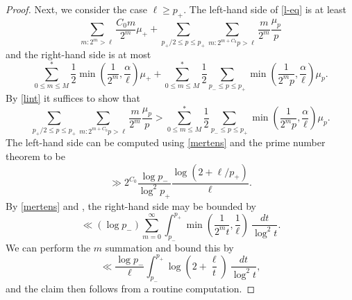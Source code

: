 \documentclass[12pt,a4paper,reqno]{amsart}
\numberwithin{equation}{section}
\theoremstyle{plain}
\theoremstyle{definition}
\begin{document}
\begin{proof}
Next, we consider the case $\ell \geq p_+$.  The left-hand side of \eqref{l-eq} is at least 
$$ \sum_{m: 2^m > \ell} \frac{C_0 m}{2^m} \mu_+ 
+ \sum_{p_+/2 \leq p \leq p_+} \sum_{m: 2^{m+C_0} p > \ell} \frac{m}{2^m} \frac{\mu_p}{p}$$
and the right-hand side is at most
\begin{equation}\label{amp} 
  \sum_{0 \leq m \leq M}^* \frac{1}{2} \min(\frac{1}{2^m}, \frac{\alpha}{\ell})\mu_+ + \sum_{0 \leq m \leq M}^* \frac{1}{2} \sum_{p_- \leq p \leq p_+} \min\left(\frac{1}{2^mp}, \frac{\alpha}{\ell}\right) \mu_p.
\end{equation}
By \eqref{lint} it suffices to show that
$$
\sum_{p_+/2 \leq p \leq p_+} \sum_{m: 2^{m+C_0} p > \ell} \frac{m}{2^m} \frac{\mu_p}{p}
> \sum_{0 \leq m \leq M}^* \frac{1}{2} \sum_{p_- \leq p \leq p_+} \min\left(\frac{1}{2^mp}, \frac{\alpha}{\ell}\right) \mu_p.$$
The left-hand side can be computed using \eqref{mertens} and the prime number theorem to be
$$ \gg 2^{C_0} \frac{\log p_-}{\log^2 p_+} \frac{\log (2+\ell/p_+)}{\ell}.$$
By \eqref{mertens} and , the right-hand side may be bounded by
$$ \ll (\log p_-) \sum_{m=0}^\infty \int_{p_-}^{p_+} \min\left(\frac{1}{2^m t}, \frac{1}{\ell}\right)\ \frac{dt}{\log^2 t}.$$
We can perform the $m$ summation and bound this by
$$ \ll \frac{\log p_-}{\ell} \int_{p_-}^{p_+} \log\left(2 + \frac{\ell}{t}\right)\ \frac{dt}{\log^2 t},$$
and the claim then follows from a routine computation.


\end{proof}
\end{document}
